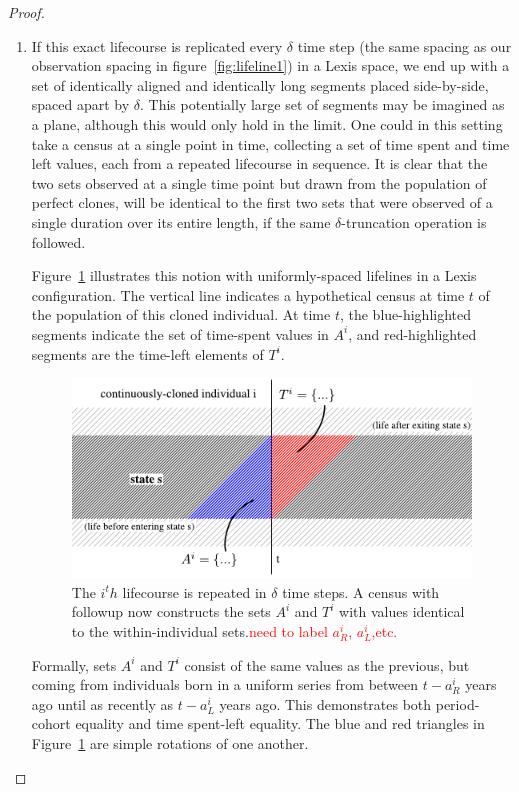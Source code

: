 \documentclass[12pt,oneside,a4paper]{article}
\theoremstyle{definition}
\begin{document}
\begin{proof}
\begin{enumerate}
\FloatBarrier
\item{} If this exact lifecourse is replicated every $\delta$ time step (the
same spacing as our observation spacing in figure~\ref{fig:lifeline1}) in a
Lexis space, we end up with a set of identically aligned and identically long segments placed side-by-side, spaced apart by $\delta$.
This potentially large set of segments may be imagined as a plane, although this
would only hold in the limit.
One could in this setting take a census at a single point in time, collecting a set of
time spent and time left values, each from a repeated lifecourse in
sequence.
It is clear that the two sets observed at a single time point but drawn from the population of
perfect clones, will be identical to the first two sets that were observed of
a single duration over its entire length, if the same $\delta$-truncation operation is followed.

Figure~\ref{fig:clones} illustrates this notion with uniformly-spaced lifelines
in a Lexis configuration. The vertical line indicates a hypothetical census at time $t$ of
the population of this cloned individual. At time $t$, the blue-highlighted segments indicate
the set of time-spent values in $A^i$, and red-highlighted segments are the
time-left elements of $T^i$. 

 \begin{figure}[h!]
\centering
\caption{The $i^th$ lifecourse is repeated in $\delta$ time steps. A
census with followup now constructs the sets $A^i$ and $T^i$ with values
identical to the within-individual sets.\textcolor{red}{need to label $a_R^i$,
$a_L^i$,etc.}}
\label{fig:clones}
\includegraphics[scale=.8]{Figures/lifelinerepeated.pdf}
\end{figure}

Formally, sets $A^i$ and $T^i$ consist of the same values as the previous, but
coming from individuals born in a uniform series from between $t-a_R^i$ years
ago until as recently as $t-a_L^i$ years ago. This demonstrates both
period-cohort equality and time spent-left equality. The blue and red triangles in
Figure~\ref{fig:clones} are simple rotations of one another.


\end{enumerate}
\end{proof}
\end{document}
